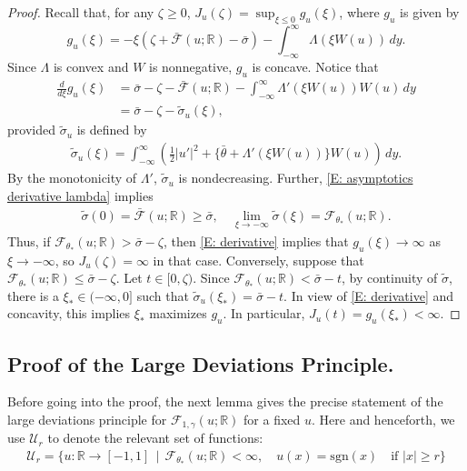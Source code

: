 \documentclass[12pt]{amsart}
\begin{document}
\begin{proof} Recall that, for any $\zeta \geq 0$, $J_{u}(\zeta) = \sup_{\xi \leq 0} g_{u}(\xi)$, where $g_{u}$ is given by
    \begin{equation*}
        g_{u}(\xi) = - \xi ( \zeta + \bar{\mathscr{F}}(u;\mathbb{R}) - \bar{\sigma} ) - \int_{-\infty}^{\infty} \Lambda(\xi W(u) ) \, dy.
    \end{equation*}
Since $\Lambda$ is convex and $W$ is nonnegative, $g_{u}$ is concave.
Notice that 
    \begin{align} \label{E: derivative}
       \frac{d}{d\xi} g_{u}(\xi) &= \bar{\sigma} - \zeta - \bar{\mathscr{F}}(u;\mathbb{R}) - \int_{-\infty}^{\infty} \Lambda'(\xi W(u)) W(u) \, dy \\
        &= \bar{\sigma} - \zeta - \tilde{\sigma}_{u}(\xi), \nonumber
    \end{align}
provided $\tilde{\sigma}_{u}$ is defined by
    \begin{align*}
        \tilde{\sigma}_{u}(\xi) = \int_{-\infty}^{\infty} \left( \frac{1}{2} |u'|^{2} + \{ \bar{\theta} + \Lambda'(\xi W(u) ) \} W(u) \right) \, dy.
    \end{align*}   
By the monotonicity of $\Lambda'$, $\tilde{\sigma}_{u}$ is nondecreasing.  Further, \eqref{E: asymptotics derivative lambda} implies
			\begin{align*}
				 \tilde{\sigma}(0) = \bar{\mathscr{F}}(u;\mathbb{R}) \geq \bar{\sigma}, \quad \lim_{\xi \to -\infty} \tilde{\sigma}(\xi) = \mathscr{F}_{\theta_{*}}(u;\mathbb{R}).
			\end{align*}
        Thus, if $\mathscr{F}_{\theta_{*}}(u;\mathbb{R}) > \bar{\sigma} - \zeta$, then \eqref{E: derivative} implies that $g_{u}(\xi) \to \infty$ as $\xi \to -\infty$, so $J_{u}(\zeta) = \infty$ in that case.  Conversely, suppose that $\mathscr{F}_{\theta_{*}}(u;\mathbb{R}) \leq \bar{\sigma} - \zeta$.  Let $t \in [0,\zeta)$.  Since $\mathscr{F}_{\theta_{*}}(u;\mathbb{R}) < \bar{\sigma} - t$, by continuity of $\tilde{\sigma}$, there is a $\xi_{*} \in (-\infty,0]$ such that $\tilde{\sigma}_{u}(\xi_{*}) = \bar{\sigma} - t$.  In view of \eqref{E: derivative} and concavity, this implies $\xi_{*}$ maximizes $g_{u}$.  In particular, $J_{u}(t) = g_{u}(\xi_{*}) < \infty$.
\end{proof}

\subsection{Proof of the Large Deviations Principle.} Before going into the proof, the next lemma gives the precise statement of the large deviations principle for $\mathscr{F}_{1,\gamma}(u;\mathbb{R})$ for a fixed $u$.  Here and henceforth, we use $\mathcal{U}_{r}$ to denote the relevant set of functions:
	\begin{align*}
		\mathcal{U}_{r} = \{ u : \mathbb{R} \to [-1,1] \, \mid \, \mathscr{F}_{\theta_{*}}(u;\mathbb{R}) <\infty, \quad u(x) = \text{sgn}(x) \quad \text{if} \, \, |x| \geq r \}
	\end{align*}
\end{document}
